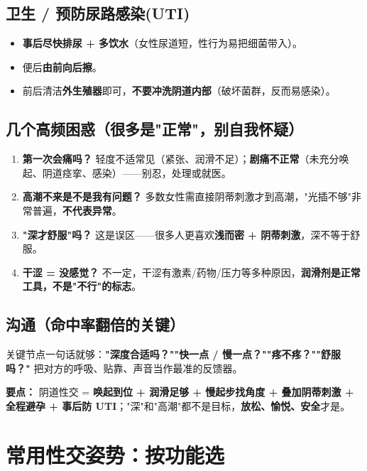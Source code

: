 \documentclass[12pt,UTF8,openany]{ctexbook}
\begin{document}
\section{卫生 / 预防尿路感染(UTI)}

\begin{itemize}[leftmargin=2em,itemsep=0.3em]
  \item \textbf{事后尽快排尿 + 多饮水}（女性尿道短，性行为易把细菌带入）。
  \item 便后\textbf{由前向后擦}。
  \item 前后清洁\textbf{外生殖器}即可，\textbf{不要冲洗阴道内部}（破坏菌群，反而易感染）。
\end{itemize}

\section{几个高频困惑（很多是"正常"，别自我怀疑）}

\begin{enumerate}[leftmargin=2em,itemsep=0.3em]
  \item \textbf{第一次会痛吗？} 轻度不适常见（紧张、润滑不足）；\textbf{剧痛不正常}（未充分唤起、阴道痉挛、感染）——别忍，处理或就医。
  \item \textbf{高潮不来是不是我有问题？} 多数女性需直接阴蒂刺激才到高潮，"光插不够"非常普遍，\textbf{不代表异常}。
  \item \textbf{"深才舒服"吗？} 这是误区——很多人更喜欢\textbf{浅而密 + 阴蒂刺激}，深不等于舒服。
  \item \textbf{干涩 = 没感觉？} 不一定，干涩有激素/药物/压力等多种原因，\textbf{润滑剂是正常工具，不是"不行"的标志}。
\end{enumerate}

\section{沟通（命中率翻倍的关键）}

关键节点一句话就够：\textbf{"深度合适吗？""快一点 / 慢一点？""疼不疼？""舒服吗？"} 把对方的呼吸、贴靠、声音当作最准的反馈器。

\vspace{1em}
\noindent\textbf{要点：} 阴道性交 = \textbf{唤起到位 + 润滑足够 + 慢起步找角度 + 叠加阴蒂刺激 + 全程避孕 + 事后防 UTI}；"深"和"高潮"都不是目标，\textbf{放松、愉悦、安全}才是。

\chapter{常用性交姿势：按功能选}
\label{chap:positions}
\end{document}
